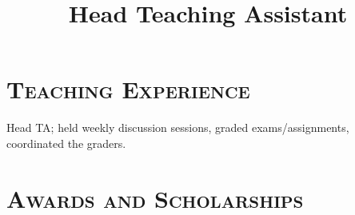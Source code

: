 \begin{resume}


  \section{\textsc{Teaching Experience}}

  \title{Head Teaching Assistant}
  \begin{position}
    Head TA; held weekly discussion sessions, graded exams/assignments, coordinated the
    graders.
  \end{position}


  \section{\textsc{Awards and Scholarships}}

  \begin{formatb}
    \\
    \body\\
  \end{formatb}


\end{resume}
